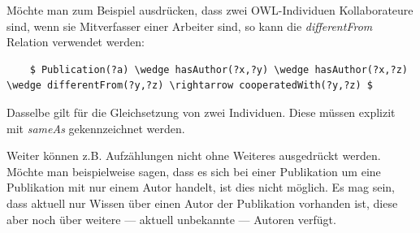 Möchte man zum Beispiel ausdrücken, dass zwei OWL-Individuen Kollaborateure sind, wenn sie Mitverfasser einer Arbeiter sind, so kann die \textit{differentFrom} Relation verwendet werden:

\lstset{language=XML}
\begin{lstlisting}
    $ Publication(?a) \wedge hasAuthor(?x,?y) \wedge hasAuthor(?x,?z) \wedge differentFrom(?y,?z) \rightarrow cooperatedWith(?y,?z) $
\end{lstlisting}

Dasselbe gilt für die Gleichsetzung von zwei Individuen. Diese müssen explizit mit \textit{sameAs} gekennzeichnet werden.

Weiter können z.B. Aufzählungen nicht ohne Weiteres ausgedrückt werden. Möchte man beispielweise sagen, dass es sich bei einer Publikation um eine Publikation mit nur einem Autor handelt, ist dies nicht möglich. Es mag sein, dass aktuell nur Wissen über einen Autor der Publikation vorhanden ist, diese aber noch über weitere --- aktuell unbekannte --- Autoren verfügt.
